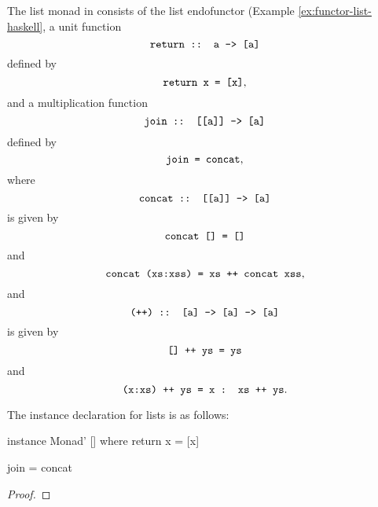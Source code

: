 \begin{example}
  \label{ex:monad-list-haskell}

  The list monad in \hask consists of the list endofunctor (Example
  \ref{ex:functor-list-haskell}, a unit function
  \begin{equation*}
    \text{\texttt{return :: a -> [a]}}
  \end{equation*}
  defined by
  \begin{equation}
    \label{eq:list-return}
    \text{\texttt{return x = [x]}}
    \text{,}
  \end{equation}
  and a multiplication function
  \begin{equation*}
    \text{\texttt{join :: [[a]] -> [a]}}
  \end{equation*}
  defined by
  \begin{equation}
    \label{eq:list-join}
    \text{\texttt{join = concat}}
    \text{,}
  \end{equation}
  where
  \begin{equation*}
    \text{\texttt{concat :: [[a]] -> [a]}}
  \end{equation*}
  is given by
  \begin{equation}
    \label{eq:list-concat-nil}
    \text{\texttt{concat [] = []}}
  \end{equation}
  and
  \begin{equation}
    \label{eq:list-concat-cons}
    \text{\texttt{concat (xs:xss) = xs ++ concat xss}}
    \text{,}
  \end{equation}
  and
  \begin{equation*}
    \text{\texttt{(++) :: [a] -> [a] -> [a]}}
  \end{equation*}
  is given by
  \begin{equation}
    \text{\texttt{[] ++ ys = ys}}
  \end{equation}
  and
  \begin{equation}
    \text{\texttt{(x:xs) ++ ys = x : xs ++ ys}}
    \text{.}
  \end{equation}

  The instance declaration for lists is as follows:
  \begin{codehaskell}
instance Monad' [] where
  return x = [x]

  join = concat
  \end{codehaskell}

  \begin{proof}


\end{proof}
\end{example}
